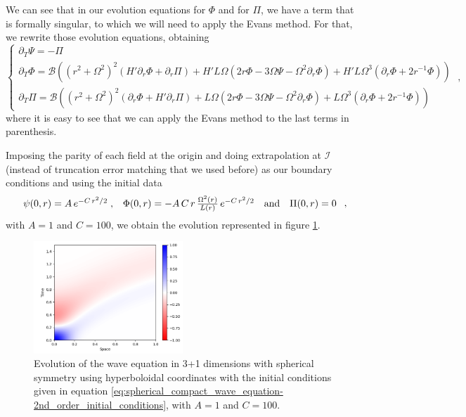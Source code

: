 We can see that in our evolution equations for $\Phi$ and for $\Pi$, we have a term that is formally singular, to which we will need to apply the Evans method. For that, we rewrite those evolution equations, obtaining
\begin{equation}
    \left\{ \begin{array}{l} 
        \partial_T \Psi = - \Pi \\ 
        \partial_T \Phi = \mathcal{B}\left((r^2 + \Omega^2)^2 \left(H' \partial_r \Phi + \partial_r\Pi\right) + H' L \Omega \left( 2r\Phi - 3 \Omega \Psi - \Omega^2 \partial_r \Phi\right) + H' L\Omega^3\left( \partial_r \Phi + 2 r^{-1}\Phi\right) \right)\\
        \partial_T \Pi = \mathcal{B}\left((r^2 + \Omega^2)^2 \left(\partial_r \Phi + H' \partial_r\Pi\right) + L \Omega \left( 2r\Phi - 3 \Omega \Psi - \Omega^2 \partial_r\Phi \right) + L \Omega^3\left( \partial_r \Phi + 2 r^{-1}\Phi \right) \right)
    \end{array} \right. \; ,
\end{equation}
%
where it is easy to see that we can apply the Evans method to the last terms in parenthesis.

Imposing the parity of each field at the origin and doing extrapolation at $\mathscr{I}$ (instead of truncation error matching that we used before) as our boundary conditions and using the initial data
\begin{equation}
    \begin{array}{c c c c}
        \psi(0,r) = A \, e^{-C \, r^2/2} \; , & \Phi(0,r) = - A \,C \, r \, \frac{\Omega^2(r)}{L(r)} \, e^{-C \, r^2/2} & \text{and} & \Pi(0,r) = 0
    \end{array} \; ,
    \label{eq:spherical_compact_wave_equation-2nd_order_initial_conditions}
\end{equation}
with $A = 1$ and $C = 100$, we obtain the evolution represented in figure \ref{fig:spherical_compact_wave_equation-2nd_order}.

\begin{figure}[h]
    \centering
    \includegraphics[width=0.5\textwidth]{Images/Wave_Equation_3+1_Spherical-Solution.png}
    \caption{Evolution of the wave equation in 3+1 dimensions with spherical symmetry using hyperboloidal coordinates with the initial conditions given in equation \eqref{eq:spherical_compact_wave_equation-2nd_order_initial_conditions}, with $A = 1$ and $C = 100$.}
    \label{fig:spherical_compact_wave_equation-2nd_order}
\end{figure}

